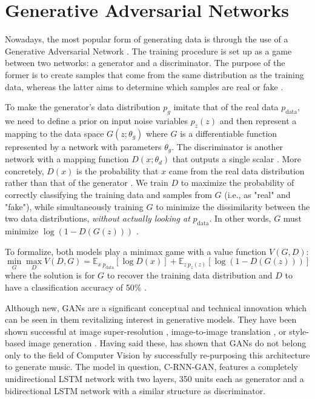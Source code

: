 \documentclass[a4paper]{book}
\begin{document}
\section{Generative Adversarial Networks} \label{sec:generative}

Nowadays, the most popular form of generating data is through the use of a Generative Adversarial Network \parencite[GAN;][]{goodfellow_generative_2014}. The training procedure is set up as a game between two networks: a generator and a discriminator. The purpose of the former is to create samples that come from the same distribution as the training data, whereas the latter aims to determine which samples are real or fake \parencite{goodfellow_nips_2016}.

To make the generator's data distribution $p_g$ imitate that of the real data $p_{\text{data}}$, we need to define a prior on input noise variables $p_{z}(z)$ and then represent a mapping to the data space $G(z; \theta_g)$ where $G$ is a differentiable function represented by a network with parameters $\theta_g$. The discriminator is another network with a mapping function $D(x; \theta_d)$ that outputs a single scalar \parencite{goodfellow_generative_2014}. More concretely, $D(x)$ is the probability that $x$ came from the real data distribution rather than that of the generator \parencite{goodfellow_nips_2016}. We train $D$ to maximize the probability of correctly classifying the training data and samples from $G$ (i.e., as "real" and "fake"), while simultaneously training $G$ to minimize the dissimilarity between the two data distributions, \emph{without actually looking at} $p_{\text{data}}$. In other words, $G$ must minimize $\log (1- D(G(z)))$ \parencite{goodfellow_generative_2014}.

To formalize, both models play a minimax game with a value function $V(G, D)$:
\begin{equation}
    \min_G \max_D V(D, G) = \mathbb{E}_{x ~ p_{\text{data}}} [ \log D(x) ] + \mathbb{E}_{z ~ p_z (z)} [ \log (1-D(G(z))) ]
\end{equation}
where the solution is for $G$ to recover the training data distribution and $D$ to have a classification accuracy of 50\% \parencite{goodfellow_generative_2014}.

Although new, GANs are a significant conceptual and technical innovation \parencite{briot_deep_2017} which can be seen in them revitalizing interest in generative models. They have been shown successful at image super-resolution \parencite{ledig_photo-realistic_2016}, image-to-image translation \parencite{isola_image--image_2016}, or style-based image generation \parencite{karras_style-based_2018}. Having said these, \textcite{mogren_c-rnn-gan_2016} has shown that GANs do not belong only to the field of Computer Vision by successfully re-purposing this architecture to generate music. The model in question, C-RNN-GAN, features a completely unidirectional LSTM network with two layers, 350 units each as generator and a bidirectional LSTM network with a similar structure as discriminator.
\end{document}
